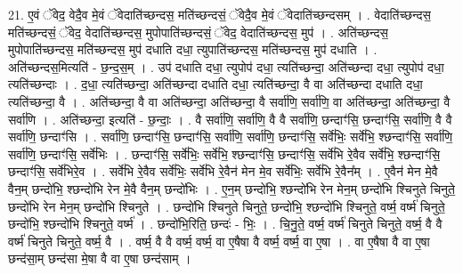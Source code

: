 \documentclass[17pt]{extarticle}
\begin{document}
21. ए॒वं ॅवेद॒ वेदै॒व मे॒वं ॅवेदाति॑च्छन्दस॒ मति॑च्छन्दसं॒ ॅवेदै॒व मे॒वं ॅवेदाति॑च्छन्दसम् । . वेदाति॑च्छन्दस॒ मति॑च्छन्दसं॒ ॅवेद॒ वेदाति॑च्छन्दस॒ मुपोपाति॑च्छन्दसं॒ ॅवेद॒ वेदाति॑च्छन्दस॒ मुप॑ । . अति॑च्छन्दस॒ मुपोपाति॑च्छन्दस॒ मति॑च्छन्दस॒ मुप॑ दधाति दधा॒ त्युपाति॑च्छन्दस॒ मति॑च्छन्दस॒ मुप॑ दधाति । . अति॑च्छन्दस॒मित्यति॑ - छ॒न्द॒स॒म् । . उप॑ दधाति दधा॒ त्युपोप॑ दधा॒ त्यति॑च्छन्दा॒ अति॑च्छन्दा दधा॒ त्युपोप॑ दधा॒ त्यति॑च्छन्दाः । . द॒धा॒ त्यति॑च्छन्दा॒ अति॑च्छन्दा दधाति दधा॒ त्यति॑च्छन्दा॒ वै वा अति॑च्छन्दा दधाति दधा॒ त्यति॑च्छन्दा॒ वै । . अति॑च्छन्दा॒ वै वा अति॑च्छन्दा॒ अति॑च्छन्दा॒ वै सर्वा॑णि॒ सर्वा॑णि॒ वा अति॑च्छन्दा॒ अति॑च्छन्दा॒ वै सर्वा॑णि । . अति॑च्छन्दा॒ इत्यति॑ - छ॒न्दाः॒ । . वै सर्वा॑णि॒ सर्वा॑णि॒ वै वै सर्वा॑णि॒ छन्दाꣳ॑सि॒ छन्दाꣳ॑सि॒ सर्वा॑णि॒ वै वै सर्वा॑णि॒ छन्दाꣳ॑सि । . सर्वा॑णि॒ छन्दाꣳ॑सि॒ छन्दाꣳ॑सि॒ सर्वा॑णि॒ सर्वा॑णि॒ छन्दाꣳ॑सि॒ सर्वे॑भिः॒ सर्वे॑भि॒ श्छन्दाꣳ॑सि॒ सर्वा॑णि॒ सर्वा॑णि॒ छन्दाꣳ॑सि॒ सर्वे॑भिः । . छन्दाꣳ॑सि॒ सर्वे॑भिः॒ सर्वे॑भि॒ श्छन्दाꣳ॑सि॒ छन्दाꣳ॑सि॒ सर्वे॑भि रे॒वैव सर्वे॑भि॒ श्छन्दाꣳ॑सि॒ छन्दाꣳ॑सि॒ सर्वे॑भिरे॒व । . सर्वे॑भि रे॒वैव सर्वे॑भिः॒ सर्वे॑भि रे॒वैन॑ मेन मे॒व सर्वे॑भिः॒ सर्वे॑भि रे॒वैन᳚म् । . ए॒वैन॑ मेन मे॒वै वैन॒म् छन्दो॑भि॒ श्छन्दो॑भि रेन मे॒वै वैन॒म् छन्दो॑भिः । . ए॒न॒म् छन्दो॑भि॒ श्छन्दो॑भि रेन मेन॒म् छन्दो॑भि श्चिनुते चिनुते॒ छन्दो॑भि रेन मेन॒म् छन्दो॑भि श्चिनुते । . छन्दो॑भि श्चिनुते चिनुते॒ छन्दो॑भि॒ श्छन्दो॑भि श्चिनुते॒ वर्ष्म॒ वर्ष्म॑ चिनुते॒ छन्दो॑भि॒ श्छन्दो॑भि श्चिनुते॒ वर्ष्म॑ । . छन्दो॑भि॒रिति॒ छन्दः॑ - भिः॒ । . चि॒नु॒ते॒ वर्ष्म॒ वर्ष्म॑ चिनुते चिनुते॒ वर्ष्म॒ वै वै वर्ष्म॑ चिनुते चिनुते॒ वर्ष्म॒ वै । . वर्ष्म॒ वै वै वर्ष्म॒ वर्ष्म॒ वा ए॒षैषा वै वर्ष्म॒ वर्ष्म॒ वा ए॒षा । . वा ए॒षैषा वै वा ए॒षा छन्द॑सा॒म् छन्द॑सा मे॒षा वै वा ए॒षा छन्द॑साम् । \newline
\end{document}
